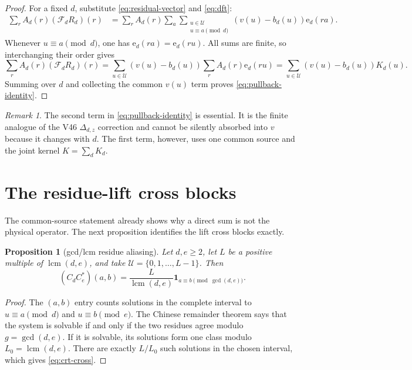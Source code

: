 \documentclass[11pt]{article}
\newtheorem{proposition}[theorem]{Proposition}
\theoremstyle{definition}
\theoremstyle{remark}
\newtheorem{remark}[theorem]{Remark}
\newcommand{\one}{\mathbf 1}
\newcommand{\UU}{\mathcal U}
\newcommand{\ee}{\mathrm e}
\newcommand{\F}{\mathcal F}
\begin{document}
\begin{proof}
For a fixed $d$, substitute \eqref{eq:residual-vector} and \eqref{eq:dft}:
\begin{align*}
 \sum_r A_d(r)(\F_dR_d)(r)
 &=\sum_rA_d(r)\sum_a\sum_{\substack{u\in\UU\\u\equiv a\pmod d}}
       (v(u)-b_d(u))\ee_d(ra).
\end{align*}
Whenever $u\equiv a\pmod d$, one has $\ee_d(ra)=\ee_d(ru)$.
All sums are finite, so interchanging their order gives
\begin{equation*}
 \sum_r A_d(r)(\F_dR_d)(r)
 =\sum_{u\in\UU}(v(u)-b_d(u))
   \sum_rA_d(r)\ee_d(ru)
 =\sum_{u\in\UU}(v(u)-b_d(u))K_d(u).
\end{equation*}
Summing over $d$ and collecting the common $v(u)$ term proves
\eqref{eq:pullback-identity}.
\end{proof}

\begin{remark}
The second term in \eqref{eq:pullback-identity} is essential.  It is the
finite analogue of the V46 $\Delta_{d,z}$ correction and cannot be silently
absorbed into $v$ because it changes with $d$.  The first term, however, uses
one common source and the joint kernel $K=\sum_dK_d$.
\end{remark}

\section{The residue-lift cross blocks}

The common-source statement already shows why a direct sum is not the physical
operator.  The next proposition identifies the lift cross blocks exactly.

\begin{proposition}[gcd/lcm residue aliasing]
\label{prop:crt}
Let $d,e\geq2$, let $L$ be a positive multiple of $\operatorname{lcm}(d,e)$,
and take $\UU=\{0,1,\ldots,L-1\}$.  Then
\begin{equation}
 (C_dC_e^*)(a,b)
 =\frac{L}{\operatorname{lcm}(d,e)}
   \one_{a\equiv b\pmod{\gcd(d,e)}}.
 \label{eq:crt-cross}
\end{equation}
\end{proposition}

\begin{proof}
The $(a,b)$ entry counts solutions in the complete interval to
$u\equiv a\pmod d$ and $u\equiv b\pmod e$.  The Chinese remainder theorem
says that the system is solvable if and only if the two residues agree modulo
$g=\gcd(d,e)$.  If it is solvable, its solutions form one class modulo
$L_0=\operatorname{lcm}(d,e)$.  There are exactly $L/L_0$ such solutions in
the chosen interval, which gives \eqref{eq:crt-cross}.
\end{proof}
\end{document}
